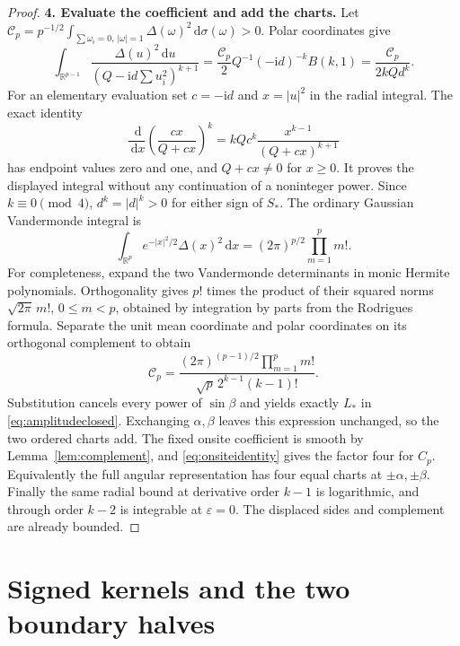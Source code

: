 \documentclass[11pt]{article}
\numberwithin{equation}{section}
\theoremstyle{definition}
\newcommand{\dd}{\,\mathrm d}
\newcommand{\ii}{\mathrm i}
\newcommand{\R}{\mathbb R}
\newcommand{\eps}{\varepsilon}
\begin{document}
\begin{proof}
\par\smallskip\noindent\textbf{4. Evaluate the coefficient and add the charts.} Let $\mathscr C_p=p^{-1/2}\int_{\sum\omega_i=0,\,|\omega|=1}
\Delta(\omega)^2\dd\sigma(\omega)>0$. Polar coordinates give
\[
 \int_{\R^{p-1}}\frac{\Delta(u)^2\dd u}
 {(Q-\ii d\sum u_i^2)^{k+1}}
 =\frac{\mathscr C_p}{2}Q^{-1}(-\ii d)^{-k}B(k,1)
 =\frac{\mathscr C_p}{2kQd^k}.
\]
For an elementary evaluation set $c=-\ii d$ and $x=|u|^2$ in
the radial integral. The exact identity
\[
 \frac{\dd}{\dd x}\left(\frac{cx}{Q+cx}\right)^k
 =kQc^k\frac{x^{k-1}}{(Q+cx)^{k+1}}
\]
has endpoint values zero and one, and $Q+cx\ne0$ for $x\ge0$.
It proves the displayed integral without any continuation of
a noninteger power. Since $k\equiv0\pmod4$,
$d^k=|d|^k>0$ for either sign of $S_*$. The ordinary Gaussian
Vandermonde integral is
\[
 \int_{\R^p}e^{-|x|^2/2}\Delta(x)^2\dd x
 =(2\pi)^{p/2}\prod_{m=1}^p m!.
\]
For completeness, expand the two Vandermonde determinants in monic
Hermite polynomials. Orthogonality gives $p!$ times the product of
their squared norms $\sqrt{2\pi}\,m!$, $0\le m<p$, obtained by
integration by parts from the Rodrigues formula. Separate the unit
mean coordinate and polar coordinates on its orthogonal complement
to obtain
\[
 \mathscr C_p=
 \frac{(2\pi)^{(p-1)/2}\prod_{m=1}^p m!}
 {\sqrt p\,2^{k-1}(k-1)!}.
\]
Substitution cancels every power of $\sin\beta$ and yields exactly
$L_*$ in \eqref{eq:amplitudeclosed}. Exchanging $\alpha,\beta$
leaves this expression unchanged, so the two ordered charts add.
The fixed onsite coefficient is smooth by Lemma~\ref{lem:complement},
and \eqref{eq:onsiteidentity} gives the factor four for $C_p$.
Equivalently the full angular representation has four equal charts
at $\pm\alpha,\pm\beta$. Finally the same radial bound at derivative
order $k-1$ is logarithmic, and through order $k-2$ is integrable
at $\eps=0$. The displaced sides and complement are already bounded.
\end{proof}

\section{Signed kernels and the two boundary halves}\label{sec:signs}
\end{document}
